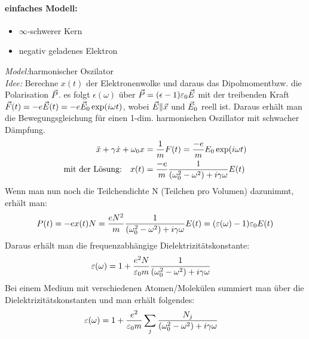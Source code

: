 \paragraph{einfaches Modell:}
\begin{itemize}
	\item$\infty$-schwerer Kern
	\item negativ geladenes Elektron
\end{itemize}
\textit{Model:}harmonischer Oszilator\\
\textit{Idee:} Berechne $x(t)$ der Elektronenwolke und daraus das Dipolmomentbzw. die Polarisation $\vec{P}$. es folgt $\epsilon(\omega)$ über $\vec{P}=(\epsilon-1)\varepsilon_0 \vec{E}$ mit der treibenden Kraft $\vec{F}(t)=-e\vec{E}(t)=-e\vec{E}_0 \exp(i\omega t)$, wobei $\vec{E}\|\vec{x}$ und $\vec{E}_0$ reell ist.
Daraus erhält man die Bewegungsgleichung für einen 1-dim. harmonischen Oszillator mit schwacher Dämpfung.
\begin{align*}
	\ddot{x}+\gamma\dot{x}+\omega_0 x&=\frac{1}{m}F(t)=\frac{-e}{m}E_0\exp(i\omega t)\\
	\text{mit der Lösung:}\quad x(t)&=\frac{-e}{m}\frac{1}{(\omega_0^2-\omega^2)+i\gamma\omega}E(t)
\end{align*}
Wenn man nun noch die Teilchendichte N (Teilchen pro Volumen) dazunimmt, erhält man:
\begin{align*}
	P(t)&=-ex(t)N=\frac{eN^2}{m}\frac{1}{(\omega_0^2-\omega^2)+i\gamma\omega}E(t)=(\varepsilon(\omega)-1)\varepsilon_0 E(t)\\
\end{align*}
Daraus erhält man die frequenzabhängige Dielektrizitätskonstante:
\begin{align*}
	 \varepsilon(\omega)&=1+\frac{e^2N}{\varepsilon_0 m}\frac{1}{(\omega_0^2-\omega^2)+i\gamma\omega}
\end{align*}
Bei einem Medium mit verschiedenen Atomen/Molekülen summiert man über die Dielektrizitätskonstanten und man erhält folgendes:
\begin{align*}
	 \varepsilon(\omega)&=1+\frac{e^2}{\varepsilon_0 m}\sum_{j}\frac{N_j}{(\omega_0^2-\omega^2)+i\gamma\omega}
\end{align*}


